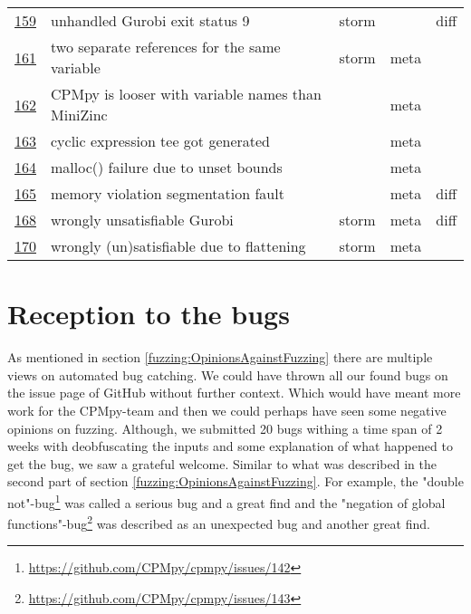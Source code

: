 \begin{table}[]
\begin{tabular}{lllll}
		\href{https://github.com/CPMpy/cpmpy/issues/159}{159} & unhandled Gurobi exit status 9                    & storm &       & diff \\
		\href{https://github.com/CPMpy/cpmpy/issues/161}{161} & two separate references for the same variable     & storm & meta  &      \\
		\href{https://github.com/CPMpy/cpmpy/issues/162}{162} & CPMpy is looser with variable names than MiniZinc &       & meta  &      \\
		\href{https://github.com/CPMpy/cpmpy/issues/163}{163} & cyclic expression tee got generated               &       & meta  &      \\
		\href{https://github.com/CPMpy/cpmpy/issues/164}{164} & malloc() failure due to unset bounds              &       & meta  &      \\
		\href{https://github.com/CPMpy/cpmpy/issues/165}{165} & memory violation segmentation fault               &       & meta  & diff \\
		\href{https://github.com/CPMpy/cpmpy/issues/168}{168} & wrongly unsatisfiable Gurobi                      & storm & meta  & diff \\
		\href{https://github.com/CPMpy/cpmpy/issues/170}{170} & wrongly (un)satisfiable due to flattening         & storm & meta  &      \\ \bottomrule
	\end{tabular}
\end{table}


\section{Reception to the bugs} 
As mentioned in section \ref{fuzzing:OpinionsAgainstFuzzing} there are multiple views on automated bug catching. We could have thrown all our found bugs on the issue page of GitHub without further context. Which would have meant more work for the CPMpy-team and then we could perhaps have seen some negative opinions on fuzzing. 
Although, we submitted 20 bugs withing a time span of 2 weeks with deobfuscating the inputs and some explanation of what happened to get the bug, we saw a grateful welcome. Similar to what was described in the second part of section \ref{fuzzing:OpinionsAgainstFuzzing}. 
For example, the "double not"-bug\footnote{\url{https://github.com/CPMpy/cpmpy/issues/142}} was called a serious bug and a great find and 
the "negation of global functions"-bug\footnote{\url{https://github.com/CPMpy/cpmpy/issues/143}} was described as an unexpected bug and another great find.

